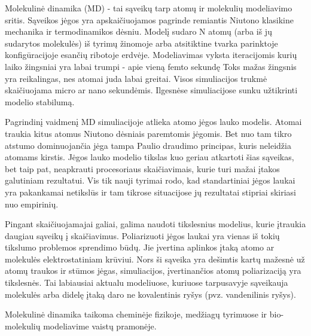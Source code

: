 Molekulinė dinamika (MD) - tai sąveikų tarp atomų ir molekulių modeliavimo sritis.
Sąveikos jėgos yra apskaičiuojamos pagrinde remiantis Niutono klasikine mechanika ir termodinamikos dėsniu.
Modelį sudaro N atomų (arba iš jų sudarytos molekulės) iš tyrimų žinomoje arba atsitiktine tvarka parinktoje konfigūracijoje esančių ribotoje erdvėje.
Modeliavimas vyksta iteracijomis kurių laiko žingsniai yra labai trumpi - apie vieną femto sekundę
Toks mažas žingsnis yra reikalingas, nes atomai juda labai greitai.
Visos simuliacijos trukmė skaičiuojama micro ar nano sekundėmis.
Ilgesnėse simuliacijose sunku užtikrinti modelio stabilumą.

Pagrindinį vaidmenį MD simuliacijoje atlieka atomo jėgos lauko modelis.
Atomai traukia kitus atomus Niutono dėsniais paremtomis jėgomis.
Bet nuo tam tikro atstumo dominuojančia jėga tampa Paulio draudimo principas, kuris neleidžia atomams kirstis.
Jėgos lauko modelio tikslas kuo geriau atkartoti šias sąveikas, bet taip pat, neapkrauti procesoriaus skaičiavimais, kurie turi mažai įtakos galutiniam rezultatui.
Vis tik nauji tyrimai rodo, kad standartiniai jėgos laukai yra pakankamai netikslūs ir tam tikrose situacijose jų rezultatai stipriai skiriasi nuo empirinių.

Pingant skaičiuojamajai galiai, galima naudoti tikslesnius modelius, kurie įtraukia daugiau sąveikų į skaičiavimus.
Poliarizuoti jėgos laukai yra vienas iš tokių tikslumo problemos sprendimo būdų.
Jie įvertina aplinkos įtaką atomo ar molekulės elektrostatiniam krūviui.
Nors ši sąveika yra dešimtis kartų mažesnė už atomų traukos ir stūmos jėgas, simuliacijos, įvertinančios atomų poliarizaciją yra tikslesnės.
Tai labiausiai aktualu modeliuose, kuriuose tarpusavyje sąveikauja molekulės arba didelę įtaką daro ne kovalentinis ryšys (pvz. vandenilinis ryšys).

Molekulinė dinamika taikoma cheminėje fizikoje, medžiagų tyrimuose ir bio-molekulių modeliavime vaistų pramonėje.
